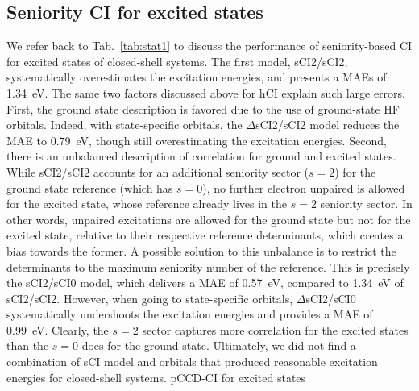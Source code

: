 \documentclass[aip,jcp,reprint,noshowkeys,superscriptaddress]{revtex4-1}
\begin{document}
\subsection{Seniority CI for excited states}
\label{sec:res_C}


We refer back to Tab.~\ref{tab:stat1} to discuss the performance of seniority-based CI for excited states of closed-shell systems.
The first model, sCI2/sCI2, systematically overestimates the excitation energies, and presents a MAEs of \SI{1.34}{\eV}.
The same two factors discussed above for hCI explain such large errors.
First, the ground state description is favored due to the use of ground-state HF orbitals.
Indeed, with state-specific orbitals, the $\Delta$sCI2/sCI2 model reduces the MAE to \SI{0.79}{\eV}, though still overestimating the excitation energies.
Second, there is an unbalanced description of correlation for ground and excited states.
While sCI2/sCI2 accounts for an additional seniority sector ($s=2$) for the ground state reference (which has $s=0$), 
no further electron unpaired is allowed for the excited state, whose reference already lives in the $s=2$ seniority sector.
In other words, unpaired excitations are allowed for the ground state but not for the excited state, relative to their respective reference determinants, which creates a bias towards the former.
A possible solution to this unbalance is to restrict the determinants to the maximum seniority number of the reference.
This is precisely the sCI2/sCI0 model, which delivers a MAE of \SI{0.57}{\eV}, compared to \SI{1.34}{\eV} of sCI2/sCI2.
However, when going to state-specific orbitals, $\Delta$sCI2/sCI0 systematically undershoots the excitation energies and provides a MAE of \SI{0.99}{\eV}.
Clearly, the $s=2$ sector captures more correlation for the excited states than the $s=0$ does for the ground state.
Ultimately, we did not find a combination of sCI model and orbitals that produced reasonable excitation energies for closed-shell systems.
pCCD-CI for excited states \cite{Nowak_2023}
\end{document}
